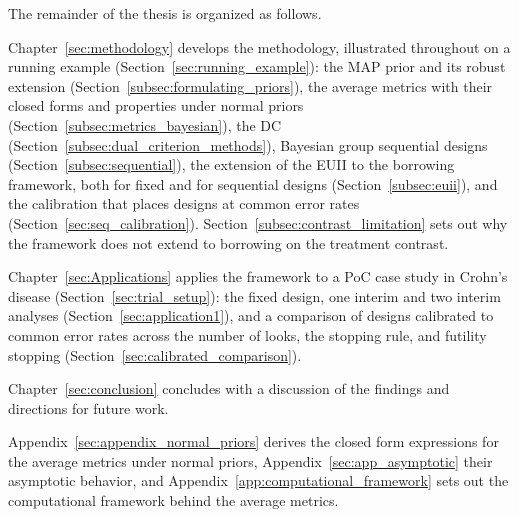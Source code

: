 The remainder of the thesis is organized as follows. 

Chapter~\ref{sec:methodology} develops the
methodology, illustrated throughout on a
running example (Section~\ref{sec:running_example}): the MAP prior and its robust
extension (Section~\ref{subsec:formulating_priors}), the average metrics with their
closed forms and properties under normal priors (Section~\ref{subsec:metrics_bayesian}),
the DC (Section~\ref{subsec:dual_criterion_methods}), Bayesian group sequential designs
(Section~\ref{subsec:sequential}), the extension of the EUII to the borrowing framework,
both for fixed and for sequential designs (Section~\ref{subsec:euii}), and the calibration
that places designs at common error rates (Section~\ref{sec:seq_calibration}).
Section~\ref{subsec:contrast_limitation} sets out why the framework does not extend to
borrowing on the treatment contrast.

Chapter~\ref{sec:Applications} applies the framework to a PoC case study in Crohn's
disease (Section~\ref{sec:trial_setup}): the fixed design, one interim and two interim
analyses (Section~\ref{sec:application1}), and a comparison of designs calibrated to
common error rates across the number of looks, the stopping rule, and futility stopping
(Section~\ref{sec:calibrated_comparison}).

Chapter~\ref{sec:conclusion} concludes
with a discussion of the findings and directions for future work.

Appendix~\ref{sec:appendix_normal_priors} derives the closed form expressions for
the average metrics under normal priors, Appendix~\ref{sec:app_asymptotic} their asymptotic behavior, and
Appendix~\ref{app:computational_framework} sets out the computational framework behind the average metrics.



